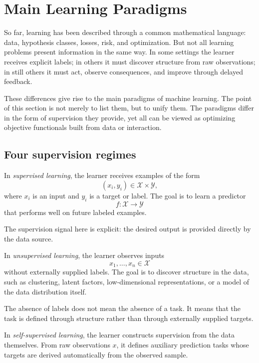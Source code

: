 \section{Main Learning Paradigms}

So far, learning has been described through a common mathematical language: data, hypothesis classes, losses, risk, and optimization. But not all learning problems present information in the same way. In some settings the learner receives explicit labels; in others it must discover structure from raw observations; in still others it must act, observe consequences, and improve through delayed feedback.

These differences give rise to the main paradigms of machine learning. The point of this section is not merely to list them, but to unify them. The paradigms differ in the form of supervision they provide, yet all can be viewed as optimizing objective functionals built from data or interaction.

\subsection*{Four supervision regimes}

\begin{definition}
In \emph{supervised learning}, the learner receives examples of the form
\[
(x_i,y_i)\in \mathcal X\times \mathcal Y,
\]
where $x_i$ is an input and $y_i$ is a target or label. The goal is to learn a predictor
\[
f:\mathcal X\to\mathcal Y
\]
that performs well on future labeled examples.
\end{definition}

The supervision signal here is explicit: the desired output is provided directly by the data source.

\begin{definition}
In \emph{unsupervised learning}, the learner observes inputs
\[
x_1,\dots,x_n\in\mathcal X
\]
without externally supplied labels. The goal is to discover structure in the data, such as clustering, latent factors, low-dimensional representations, or a model of the data distribution itself.
\end{definition}

The absence of labels does not mean the absence of a task. It means that the task is defined through structure rather than through externally supplied targets.

\begin{definition}
In \emph{self-supervised learning}, the learner constructs supervision from the data themselves. From raw observations $x$, it defines auxiliary prediction tasks whose targets are derived automatically from the observed sample.
\end{definition}

